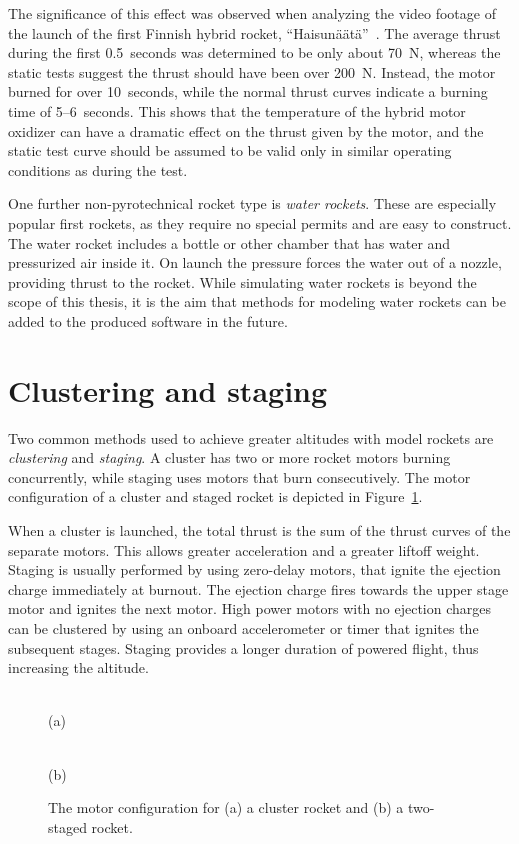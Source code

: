 The significance of this effect was observed when analyzing the video
footage of the launch of the first Finnish hybrid rocket,
``Haisunäätä''~\cite{haisunaata-launch}.  The average thrust during the
first 0.5~seconds was determined to be only about 70~N, whereas the
static tests suggest the thrust should have been over 200~N.
Instead, the motor burned for over 10~seconds, while the normal thrust
curves indicate a burning time of 5--6~seconds.  This shows that the
temperature of the hybrid motor oxidizer can have a dramatic effect on
the thrust given by the motor, and the static test curve should be
assumed to be valid only in similar operating conditions as during the
test.

One further non-pyrotechnical rocket type is {\it water rockets}.
These are especially popular first rockets, as they require no special
permits and are easy to construct.  The water rocket includes a bottle
or other chamber that has water and pressurized air inside it.  On
launch the pressure forces the water out of a nozzle, providing thrust
to the rocket.  While simulating water rockets is beyond the scope of
this thesis, it is the aim that methods for modeling water rockets can
be added to the produced software in the future.



\section{Clustering and staging}

Two common methods used to achieve greater altitudes with model
rockets are {\it clustering} and {\it staging}.  A cluster has two or
more rocket motors burning concurrently, while staging uses motors
that burn consecutively.  The motor configuration of a cluster and
staged rocket is depicted in Figure~\ref{fig-cluster-stages}.

When a cluster is launched, the total thrust is the sum of the thrust
curves of the separate motors.  This allows greater acceleration and
a greater liftoff weight.  Staging is usually performed by using
zero-delay motors, that ignite the ejection charge immediately at
burnout.  The ejection charge fires towards the upper stage motor and
ignites the next motor.  High power motors with no ejection charges
can be clustered by using an onboard accelerometer or timer that
ignites the subsequent stages.  Staging provides a longer duration of
powered flight, thus increasing the altitude.


\begin{figure}
\centering
\parbox{65mm}{\centering
{} \\ (a)}
\hspace{10mm}
\parbox{40mm}{\centering
{} \\ (b)}
\caption{The motor configuration for (a) a cluster rocket and (b) a
  two-staged rocket.}
\label{fig-cluster-stages}
\end{figure}

